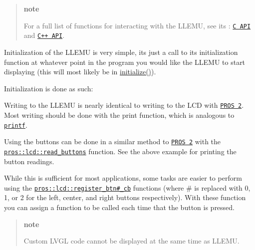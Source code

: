 \begin{quote}
{\bfseries note}

For a full list of functions for interacting with the L\+L\+E\+MU, see its \+: \href{../../api/c/llemu.html}{\tt C A\+PI} and \href{../../api/cpp/llemu.html}{\tt C++ A\+PI}.

\end{quote}


Initialization of the L\+L\+E\+MU is very simple, it\textquotesingle{}s just a call to its initialization function at whatever point in the program you would like the L\+L\+E\+MU to start displaying (this will most likely be in {\ttfamily \hyperlink{main_8h_a9efe22aaead3a5e936b5df459de02eba}{initialize()}}).

Initialization is done as such\+:

Writing to the L\+L\+E\+MU is nearly identical to writing to the L\+CD with \href{../../cortex/tutorials/lcd.html}{\tt P\+R\+OS 2}. Most writing should be done with the print function, which is analogous to \href{http://www.cplusplus.com/reference/cstdio/printf/}{\tt printf}.

Using the buttons can be done in a similar method to \href{../../../cortex/tutorials/lcd.html}{\tt P\+R\+OS 2} with the \href{../../api/cpp/llemu.html#read-buttons}{\tt pros\+::lcd\+::read\+\_\+buttons} function. See the above example for printing the button readings.

While this is sufficient for most applications, some tasks are easier to perform using the \href{../../api/cpp/llemu.html#register-btn0-cb}{\tt pros\+::lcd\+::register\+\_\+btn\#\+\_\+cb} functions (where \# is replaced with 0, 1, or 2 for the left, center, and right buttons respectively). With these function you can assign a function to be called each time that the button is pressed.

\begin{quote}
{\bfseries note}

Custom L\+V\+GL code cannot be displayed at the same time as L\+L\+E\+MU.\end{quote}
